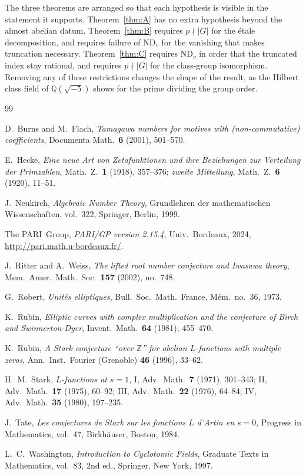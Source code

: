 \documentclass[11pt]{article}
\theoremstyle{plain}
\theoremstyle{definition}
\theoremstyle{remark}
\newcommand{\Z}{\mathbb{Z}}
\newcommand{\Q}{\mathbb{Q}}
\begin{document}
The three theorems are arranged so that each hypothesis is visible in the statement it supports.
Theorem~\ref{thm:A} has no extra hypothesis beyond the almost abelian datum.
Theorem~\ref{thm:B} requires $p\nmid|G|$ for the \'etale decomposition, and requires failure of $\mathrm{ND}_v$ for the vanishing that makes truncation necessary.
Theorem~\ref{thm:C} requires $\mathrm{ND}_v$ in order that the truncated index stay rational, and requires $p\nmid|G|$ for the class-group isomorphism.
Removing any of these restrictions changes the shape of the result, as the Hilbert class field of $\Q(\sqrt{-5})$ shows for the prime dividing the group order.

\begin{thebibliography}{99}

D.~Burns and M.~Flach,
\emph{Tamagawa numbers for motives with (non-commutative) coefficients},
Documenta Math.\ \textbf{6} (2001), 501--570.

E.~Hecke,
\emph{Eine neue Art von Zetafunktionen und ihre Beziehungen zur Verteilung der Primzahlen},
Math.\ Z.\ \textbf{1} (1918), 357--376;
\emph{zweite Mitteilung}, Math.\ Z.\ \textbf{6} (1920), 11--51.

J.~Neukirch,
\emph{Algebraic Number Theory},
Grundlehren der mathematischen Wissenschaften, vol.~322,
Springer, Berlin, 1999.

The PARI~Group,
\emph{PARI/GP version 2.15.4},
Univ.\ Bordeaux, 2024,
\url{http://pari.math.u-bordeaux.fr/}.

J.~Ritter and A.~Weiss,
\emph{The lifted root number conjecture and Iwasawa theory},
Mem.\ Amer.\ Math.\ Soc.\ \textbf{157} (2002), no.~748.

G.~Robert,
\emph{Unit\'es elliptiques},
Bull.\ Soc.\ Math.\ France, M\'em.\ no.~36, 1973.

K.~Rubin,
\emph{Elliptic curves with complex multiplication and the conjecture of Birch and Swinnerton-Dyer},
Invent.\ Math.\ \textbf{64} (1981), 455--470.

K.~Rubin,
\emph{A Stark conjecture ``over $\Z$'' for abelian $L$-functions with multiple zeros},
Ann.\ Inst.\ Fourier (Grenoble) \textbf{46} (1996), 33--62.

H.~M.~Stark,
\emph{$L$-functions at $s=1$},
I, Adv.\ Math.\ \textbf{7} (1971), 301--343;
II, Adv.\ Math.\ \textbf{17} (1975), 60--92;
III, Adv.\ Math.\ \textbf{22} (1976), 64--84;
IV, Adv.\ Math.\ \textbf{35} (1980), 197--235.

J.~Tate,
\emph{Les conjectures de Stark sur les fonctions $L$ d'Artin en $s=0$},
Progress in Mathematics, vol.~47,
Birkh\"auser, Boston, 1984.

L.~C.~Washington,
\emph{Introduction to Cyclotomic Fields},
Graduate Texts in Mathematics, vol.~83,
2nd ed., Springer, New York, 1997.

\end{thebibliography}
\end{document}
